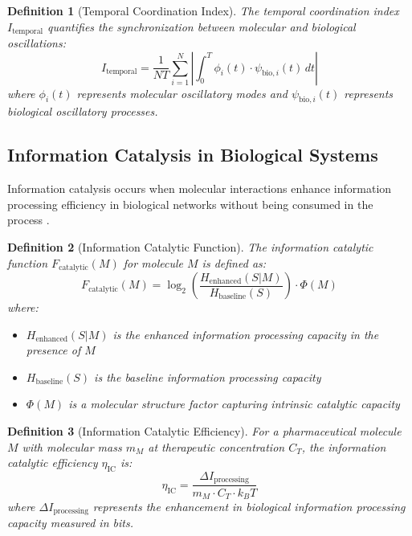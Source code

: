 \documentclass[12pt,a4paper]{article}
\newtheorem{definition}{Definition}[section]
\begin{document}
\begin{definition}[Temporal Coordination Index]
The temporal coordination index $I_{\text{temporal}}$ quantifies the synchronization between molecular and biological oscillations:
\begin{equation}
I_{\text{temporal}} = \frac{1}{N T} \sum_{i=1}^{N} \left| \int_0^T \phi_i(t) \cdot \psi_{\text{bio},i}(t) \, dt \right|
\end{equation}
where $\phi_i(t)$ represents molecular oscillatory modes and $\psi_{\text{bio},i}(t)$ represents biological oscillatory processes.
\end{definition}

\subsection{Information Catalysis in Biological Systems}

Information catalysis occurs when molecular interactions enhance information processing efficiency in biological networks without being consumed in the process \citep{mizraji2007biological}.

\begin{definition}[Information Catalytic Function]
The information catalytic function $F_{\text{catalytic}}(M)$ for molecule $M$ is defined as:
\begin{equation}
F_{\text{catalytic}}(M) = \log_2\left(\frac{H_{\text{enhanced}}(S|M)}{H_{\text{baseline}}(S)}\right) \cdot \Phi(M)
\end{equation}
where:
\begin{itemize}
\item $H_{\text{enhanced}}(S|M)$ is the enhanced information processing capacity in the presence of $M$
\item $H_{\text{baseline}}(S)$ is the baseline information processing capacity
\item $\Phi(M)$ is a molecular structure factor capturing intrinsic catalytic capacity
\end{itemize}
\end{definition}

\begin{definition}[Information Catalytic Efficiency]
For a pharmaceutical molecule $M$ with molecular mass $m_M$ at therapeutic concentration $C_T$, the information catalytic efficiency $\eta_{\text{IC}}$ is:
\begin{equation}
\eta_{\text{IC}} = \frac{\Delta I_{\text{processing}}}{m_M \cdot C_T \cdot k_B T}
\end{equation}
where $\Delta I_{\text{processing}}$ represents the enhancement in biological information processing capacity measured in bits.
\end{definition}
\end{document}
